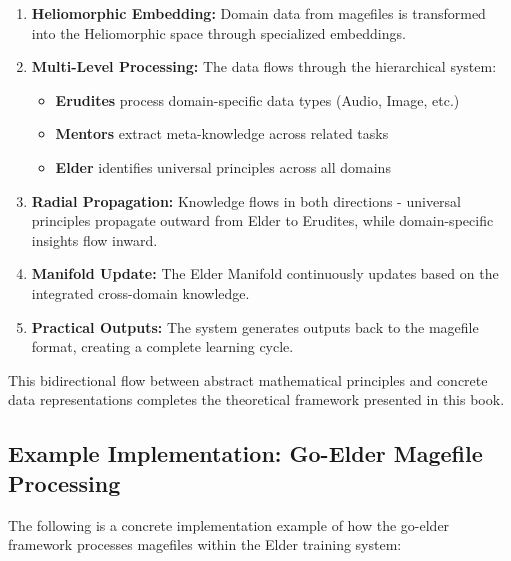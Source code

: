 \begin{enumerate}
    \item \textbf{Heliomorphic Embedding:} Domain data from magefiles is transformed into the Heliomorphic space through specialized embeddings.
    
    \item \textbf{Multi-Level Processing:} The data flows through the hierarchical system:
      \begin{itemize}
        \item \textbf{Erudites} process domain-specific data types (Audio, Image, etc.)
        \item \textbf{Mentors} extract meta-knowledge across related tasks
        \item \textbf{Elder} identifies universal principles across all domains
      \end{itemize}
    
    \item \textbf{Radial Propagation:} Knowledge flows in both directions - universal principles propagate outward from Elder to Erudites, while domain-specific insights flow inward.
    
    \item \textbf{Manifold Update:} The Elder Manifold continuously updates based on the integrated cross-domain knowledge.
    
    \item \textbf{Practical Outputs:} The system generates outputs back to the magefile format, creating a complete learning cycle.
\end{enumerate}

This bidirectional flow between abstract mathematical principles and concrete data representations completes the theoretical framework presented in this book.

\subsection{Example Implementation: Go-Elder Magefile Processing}

The following is a concrete implementation example of how the go-elder framework processes magefiles within the Elder training system:

